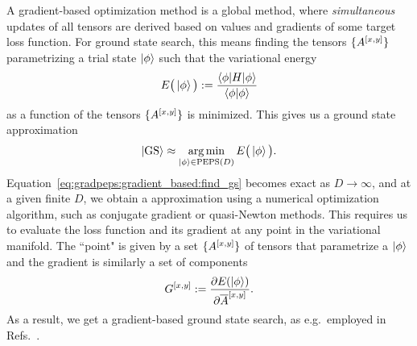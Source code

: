 A gradient-based optimization method is a global method, where \emph{simultaneous} updates of all tensors are derived based on values and gradients of some target loss function.
%
For ground state search, this means finding the  tensors $\set{A^{[x,y]}}$ parametrizing a trial state $\ket{\phi}$ such that the variational energy 
\begin{equation}
    \label{eq:gradpeps:gradient_based:variational_energy}
    E\big(\ket{\phi}\big)
    := \frac{\braopket{\phi}{H}{\phi}}{\braket{\phi}{\phi}}
\end{equation}
as a function of the  tensors $\set{A^{[x,y]}}$ is minimized.
%
This gives us a ground state approximation
\begin{equation}
    \label{eq:gradpeps:gradient_based:find_gs}
    \ket{\text{GS}}
    \approx \argmin_{\ket{\phi}\in\text{PEPS}(D)} E\big(\ket{\phi} \big)
    .
\end{equation}
%
Equation~\eqref{eq:gradpeps:gradient_based:find_gs} becomes exact as $D \to \infty$, and at a given finite $D$, we obtain a  approximation using a numerical optimization algorithm, such as conjugate gradient or quasi-Newton methods.
%
This requires us to evaluate the loss function and its gradient at any point in the variational manifold.
%
The ``point" is given by a set $\set{A^{[x,y]}}$ of tensors that parametrize a  $\ket{\phi}$ and the gradient is similarly a set of components
\begin{equation}
    \label{eq:gradpeps:gradient_of_energy}
    G^{[x,y]} := \frac{\partial E(\ket{\phi})}{\partial \conj{A}^{[x,y]}}
    .
\end{equation}
%
As a result, we get a gradient-based ground state search, as e.g.~employed in Refs.~\cite{hasik2021, scheb2023}.



